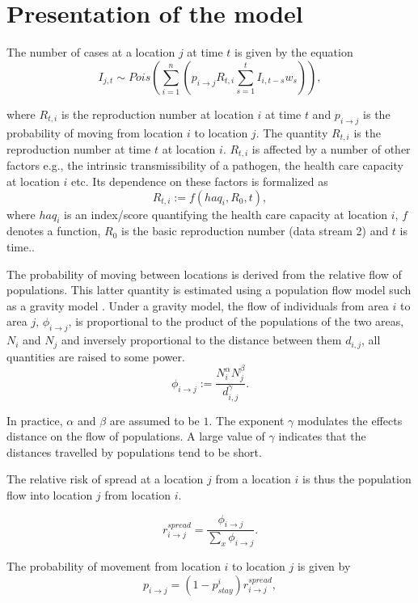 \documentclass[11pt,]{article}
\begin{document}
\section{Presentation of the model}\label{sec:model}

The number of cases at a location \(j\) at time \(t\) is given by the equation
\[
  I_{j, t} \sim Pois\left( \sum_{i = 1}^{n} {\left( p_{i \rightarrow j}
  R_{t, i} \sum_{s = 1}^{t}{I_{i, t - s} w_{s}}\right)} \right),
\]

where \(R_{t, i}\) is the reproduction number at location \(i\) at time
\(t\) and \(p_{i \rightarrow j}\) is the probability of moving from
location \(i\) to location \(j\). The quantity $R_{t, i}$ is the
reproduction number at time $t$ at location $i$. $R_{t, i}$ is
affected by a number of other factors e.g., the intrinsic
transmissibility of a pathogen, the health care capacity at location
$i$ etc. Its dependence on these factors is formalized as
\[ R_{t, i} := f(haq_i, R_0, t),\]
where $haq_i$ is an index/score quantifying the health care capacity at location 
$i$, $f$ denotes a function, $R_0$ is the basic reproduction number (data stream 2) and $t$ is time..

The probability of moving between locations is derived from the
relative flow of populations.
This latter quantity is estimated using a population flow
model such as a gravity model \citep{GROSCHE2007175}. Under a gravity model, the flow of individuals from area \(i\) to area \(j\),
\(\phi_{i \rightarrow j}\), is proportional to the product of the
populations of the two areas, \(N_i\) and \(N_j\) and inversely
proportional to the distance between them \(d_{i, j}\), all quantities
are raised to some power.
\[
  \phi_{i \rightarrow j} :=  \frac{N_i^{\alpha}N_j^{\beta}}{d_{i, j}^{\gamma}}.
\]

In practice, \( \alpha \) and \( \beta \) are assumed to be $1$. The
exponent \( \gamma \) modulates the effects distance on the flow of
populations. A large value of \( \gamma \) indicates that the
distances travelled by populations tend to be short.

The relative risk of spread at a location \(j\) from a location \(i\)
is thus the population flow into location \(j\) from location \(i\).

\[
  r_{i \rightarrow j}^{spread} = \frac{\phi_{i \rightarrow
  j}}{\sum_{x}{\phi_{i \rightarrow
  j}}}.
\]

The probability of movement from location \(i\) to location \(j\) is given by
\[  p_{i \rightarrow j} = (1 - p_{stay}^i) r_{i \rightarrow j}^{spread},\]
\end{document}
